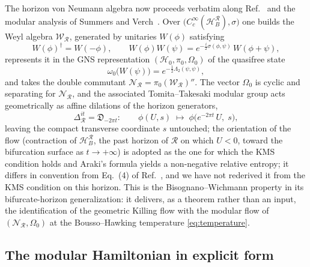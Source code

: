 \documentclass[11pt]{article}
\begin{document}
The horizon von Neumann algebra now proceeds verbatim along Ref.~\cite{DorauMuch} and the modular analysis of Summers and Verch~\cite{SummersVerch}. Over $\big(C_c^\infty(\mathcal{H}_B^{\mathcal{R}}), \sigma\big)$ one builds the Weyl algebra $\mathscr{W}_{\mathcal{R}}$, generated by unitaries $W(\phi)$ satisfying
\begin{equation}
W(\phi)^\dagger = W(-\phi),
\qquad
W(\phi) W(\psi) = e^{-\frac{i}{2}\sigma(\phi,\psi)}\, W(\phi+\psi),
\end{equation}
represents it in the GNS representation $(\mathscr{H}_0, \pi_0, \Omega_0)$ of the quasifree state
\begin{equation}
\omega_0\big(W(\psi)\big) = e^{-\frac{1}{2}\Lambda_2(\psi,\psi)},
\end{equation}
and takes the double commutant $\mathscr{N}_{\mathcal{R}} = \pi_0(\mathscr{W}_{\mathcal{R}})''$. The vector $\Omega_0$ is cyclic and separating for $\mathscr{N}_{\mathcal{R}}$, and the associated Tomita--Takesaki modular group acts geometrically as affine dilations of the horizon generators,
\begin{equation}
\Delta_{\mathcal{R}}^{it} = \mathfrak{D}_{-2\pi t}:
\qquad
\phi(U, s) \;\longmapsto\; \phi\big(e^{-2\pi t}\, U,\; s\big),
\label{eq:dilations}
\end{equation}
leaving the compact transverse coordinate $s$ untouched; the orientation of the flow (contraction of $\mathcal{H}_B^{\mathcal{R}}$, the past horizon of $\mathcal R$ on which $U<0$, toward the bifurcation surface as $t \to +\infty$) is adopted as the one for which the KMS condition holds and Araki's formula yields a non-negative relative entropy; it differs in convention from Eq.~(4) of Ref.~\cite{DorauMuch}, and we have not rederived it from the KMS condition on this horizon. This is the Bisognano--Wichmann property in its bifurcate-horizon generalization: it delivers, as a theorem rather than an input, the identification of the geometric Killing flow with the modular flow of $(\mathscr{N}_{\mathcal{R}}, \Omega_0)$ at the Bousso--Hawking temperature \eqref{eq:temperature}.

\subsection{The modular Hamiltonian in explicit form}
\label{sec:modularH}
\end{document}
